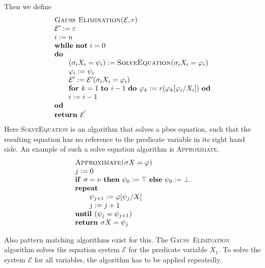 \documentclass{article}
\begin{document}
Then we define%
\begin{equation*}
\begin{array}{l}
\text{\textsc{Gau\textsc{\ss\ }Elimination(}}\mathcal{E},r\text{\textsc{)}}
\\
\mathcal{E}^{\prime }:=\varepsilon \\
i:=n \\
\text{\textbf{while} \textbf{not} }i=0 \\
\text{\textbf{do}} \\
\qquad (\sigma _{i}X_{i}=\psi _{i}):=\text{\textsc{SolveEquation(}}\sigma
_{i}X_{i}=\varphi _{i}\text{\textsc{)}} \\
\qquad \varphi _{i}:=\psi _{i} \\
\qquad \mathcal{E}^{\prime }:=\mathcal{E}^{\prime }(\sigma _{i}X_{i}=\varphi
_{i}) \\
\qquad \text{\textbf{for }}k=1\text{ \textbf{to }}i-1\text{ \textbf{do }}%
\varphi _{k}:=r(\varphi _{k}[\varphi _{i}/X_{i}])\text{ \textbf{od}} \\
\qquad i:=i-1 \\
\text{\textbf{od}} \\
\text{\textbf{return }}\mathcal{E}^{^{\prime }}%
\end{array}%
\end{equation*}%
Here \textsc{SolveEquation} is an algorithm that solves a pbes equation,
such that the resulting equation has no reference to the predicate variable
in its right hand side. An example of such a solve equation algorithm is
\textsc{Approximate}.%
\begin{equation*}
\begin{array}{l}
\text{\textsc{Approximate(}}\sigma X=\varphi \text{\textsc{)}} \\
j:=0 \\
\text{\textbf{if }}\sigma =\nu \text{ \textbf{then} }\psi _{0}:=\top \text{
\textbf{else} }\psi _{0}:=\bot \\
\text{\textbf{repeat}} \\
\qquad \psi _{j+1}:=\varphi \lbrack \psi _{j}/X] \\
\qquad j:=j+1 \\
\text{\textbf{until }}(\psi _{j}=\psi _{j+1}) \\
\text{\textbf{return }}\sigma X=\psi _{j}%
\end{array}%
\end{equation*}

Also pattern matching algorithms exist for this. The \textsc{Gau\textsc{\ss\
}Elimination} algorithm solves the equation system $\mathcal{E}$ for the
predicate variable $X_{1}$. To solve the system $\mathcal{E}$ for all
variables, the algorithm has to be applied repeatedly.
\end{document}
